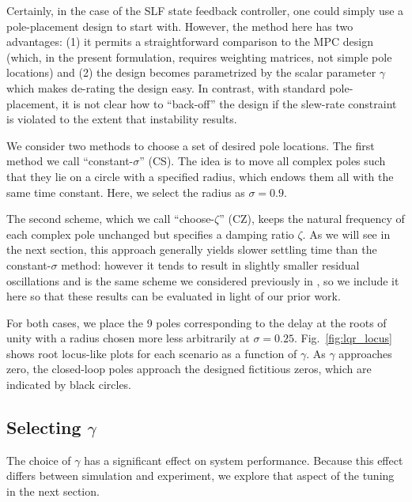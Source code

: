\documentclass[twocolumn,twoside]{IEEEtran}
\begin{document}
Certainly, in the case of the SLF state feedback controller, one could simply use a pole-placement design to start with. However, the method here has two advantages: (1) it permits a straightforward comparison to the MPC design (which, in the present formulation, requires weighting matrices, not simple pole locations) and (2) the design becomes parametrized by the scalar parameter $\gamma$ which makes de-rating the design easy. In contrast, with standard pole-placement, it is not clear how to ``back-off'' the design if the slew-rate constraint is violated to the extent that instability results. 

We consider two methods to choose a set of desired pole locations. The first method we call ``constant-$\sigma$'' (CS). The idea is to move all complex poles such that they lie on a circle with a specified radius, which endows them all with the same time constant. Here, we select the radius as $\sigma=0.9$.

The second scheme, which we call ``choose-$\zeta$'' (CZ), keeps the natural frequency of each complex pole unchanged but specifies a damping ratio $\zeta$. As we will see in the next section, this approach generally yields slower settling time than the constant-$\sigma$ method: however it tends to result in slightly smaller residual oscillations and is the same scheme we considered previously in \cite{braker_fast_2017, braker_application_2017}, so we include it here so that these results can be evaluated in light of our prior work.

For both cases, we place the 9 poles corresponding to the delay at the roots of unity with a radius chosen more less arbitrarily at ${\sigma=0.25}$. Fig.~\ref{fig:lqr_locus} shows root locus-like plots for each scenario as a function of $\gamma$. As $\gamma$ approaches zero, the closed-loop poles approach the designed fictitious zeros, which are indicated by black circles. 

\subsection{Selecting $\gamma$}
The choice of $\gamma$ has a significant effect on system performance. Because this effect differs between simulation and experiment, we explore that aspect of the tuning in the next section.
\end{document}
